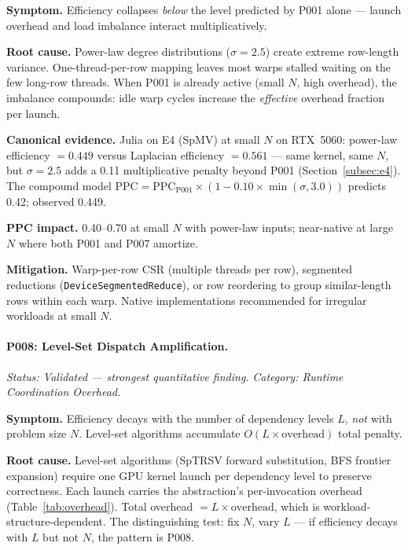 \noindent\textbf{Symptom.}
Efficiency collapses \emph{below} the level predicted by P001 alone ---
launch overhead and load imbalance interact multiplicatively.

\noindent\textbf{Root cause.}
Power-law degree distributions ($\sigma = 2.5$) create extreme row-length
variance. One-thread-per-row mapping leaves most warps stalled waiting on the
few long-row threads. When P001 is already active (small $N$, high overhead),
the imbalance compounds: idle warp cycles increase the \emph{effective}
overhead fraction per launch.

\noindent\textbf{Canonical evidence.}
Julia on E4 (SpMV) at small $N$ on RTX~5060: power-law efficiency $= 0.449$
versus Laplacian efficiency $= 0.561$ --- same kernel, same $N$, but
$\sigma = 2.5$ adds a 0.11 multiplicative penalty beyond P001
(Section~\ref{subsec:e4}). The compound model
$\text{PPC} = \text{PPC}_{\text{P001}} \times (1 - 0.10 \times
\min(\sigma, 3.0))$ predicts 0.42; observed 0.449.

\noindent\textbf{PPC impact.} 0.40--0.70 at small $N$ with power-law inputs;
near-native at large $N$ where both P001 and P007 amortize.

\noindent\textbf{Mitigation.}
Warp-per-row CSR (multiple threads per row), segmented reductions
(\texttt{DeviceSegmentedReduce}), or row reordering to group similar-length
rows within each warp. Native implementations recommended for irregular
workloads at small $N$.

\paragraph{P008: Level-Set Dispatch Amplification.}
\textit{Status: Validated --- strongest quantitative finding.}
\textit{Category: Runtime Coordination Overhead.}

\noindent\textbf{Symptom.}
Efficiency decays with the number of dependency levels $L$, \emph{not} with
problem size $N$. Level-set algorithms accumulate
$O(L \times \text{overhead})$ total penalty.

\noindent\textbf{Root cause.}
Level-set algorithms (SpTRSV forward substitution, BFS frontier expansion)
require one GPU kernel launch per dependency level to preserve correctness.
Each launch carries the abstraction's per-invocation overhead
(Table~\ref{tab:overhead}). Total overhead $= L \times \text{overhead}$,
which is workload-structure-dependent. The distinguishing test: fix $N$, vary
$L$ --- if efficiency decays with $L$ but not $N$, the pattern is P008.

